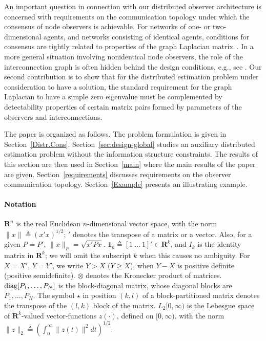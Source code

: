 \documentclass[a4paper,twocolumn]{autart}
\begin{document}
An important question in connection with our
distributed observer architecture is concerned
with  requirements on the communication topology under which the 
consensus of node observers is achievable. 
For networks of one- or two-dimensional agents, and
networks consisting of identical agents, conditions for consensus are tightly
related to properties of the graph Laplacian
matrix~\cite{OM-2004,RB-2005,ZLD-2011}. In a more general situation 
involving nonidentical node observers, the role of the interconnection graph
is often hidden behind the design conditions,
e.g., see \cite{SS-2009,SWH-2010}. Our second contribution is to show that
for the distributed 
estimation problem under consideration to have a solution, the standard
requirement for the graph Laplacian to have a simple zero eigenvalue must be
complemented by detectability properties of certain matrix pairs formed by
parameters of the observers and interconnections.  

The paper is organized as follows. The problem formulation is given in
Section~\ref{Distr.Cons}. Section~\ref{sec:design-global} studies an
auxiliary distributed 
estimation problem without the information structure constraints. The
results of this section are then used in Section~\ref{main} where the main
results of the paper are given. Section~\ref{requirements} discusses
requirements on the observer communication
topology. Section~\ref{Example} presents an
illustrating example. 


\paragraph*{Notation} $\mathbf{R}^n$ is the real
Euclidean $n$-dimensional vector space, with the norm $\|x\|\triangleq
(x'x)^{1/2}$;  $'$ denotes the transpose of a matrix or a
vector. Also, for a given $P=P'$,
$\|x\|_P=\sqrt{x'Px}$. 
$\mathbf{1}_k\triangleq [1~\ldots~1]'\in \mathbf{R}^k$, and
$I_k$ is the identity matrix in $\mathbf{R}^k$; we will omit the
subscript $k$ when this causes no ambiguity. 
For $X=X'$, $Y=Y'$,
we write $Y>X$ ($Y\ge X$), when  $Y-X$ is positive definite
(positive semidefinite).  $\otimes$
  denotes the Kronecker product of matrices.
$\mathop{\mathrm{diag}}\nolimits[P_1,\ldots,P_N]$
  is the block-diagonal matrix, whose  diagonal
  blocks are $P_1,\ldots,P_N$. The symbol $\star$ in  position $(k,l)$
of a block-partitioned matrix denotes the transpose of the $(l,k)$ block of
the matrix. $L_2[0,\infty)$ is the Lebesgue space of
$\mathbf{R}^k$-valued vector-functions $z(\cdot)$, defined on $[0,\infty)$,
with the norm $\|z\|_2\triangleq 
\left(\int_0^\infty\|z(t)\|^2dt\right)^{1/2}$. 
\end{document}
